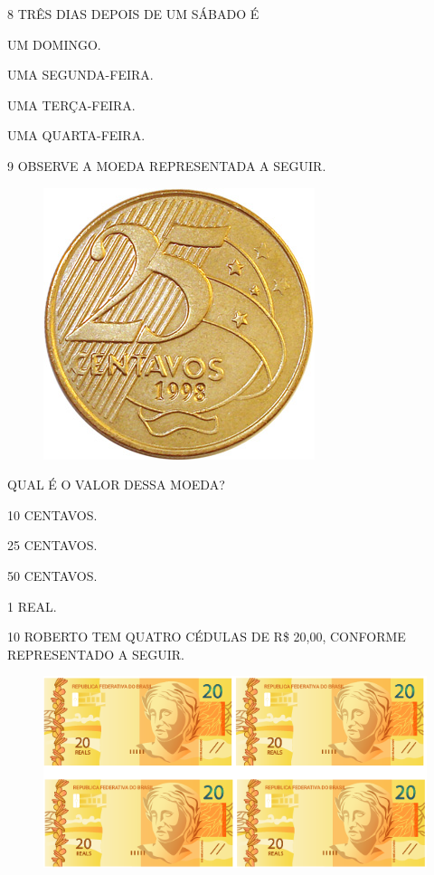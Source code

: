 \num{8} TRÊS DIAS DEPOIS DE UM SÁBADO É

\begin{escolha}[itemsep=0pt]
\item UM DOMINGO.

\item UMA SEGUNDA-FEIRA.

\item UMA TERÇA-FEIRA.

\item UMA QUARTA-FEIRA.
\end{escolha}

\num{9} OBSERVE A MOEDA REPRESENTADA A SEGUIR.

\begin{figure}[H]
\centering
\includegraphics[width=.3\textwidth]{./media/SAEB_1ANO_MAT_FIGURA132.png}
\end{figure}

QUAL É O VALOR DESSA MOEDA?

\begin{escolha}[itemsep=0pt]
\item 10 CENTAVOS.

\item 25 CENTAVOS.

\item 50 CENTAVOS.

\item 1 REAL.
\end{escolha}

\pagebreak

\num{10} ROBERTO TEM QUATRO CÉDULAS DE R\$ 20,00, CONFORME REPRESENTADO A SEGUIR.

\begin{figure}[H]
\centering
\includegraphics[width=\textwidth]{./media/SAEB_1ANO_MAT_FIGURA133b.png}
\end{figure}

